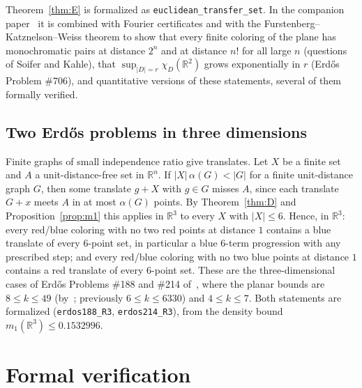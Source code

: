\documentclass[11pt]{amsart}
\theoremstyle{definition}
\newcommand{\R}{\mathbb{R}}
\begin{document}
Theorem~\ref{thm:E} is formalized as \texttt{euclidean\_transfer\_set}. In the companion paper~\cite{BassMono} it is combined with Fourier certificates and with the Furstenberg--Katznelson--Weiss theorem to show that every finite coloring of the plane has monochromatic pairs at distance $2^n$ and at distance $n!$ for all large $n$ (questions of Soifer and Kahle), that $\sup_{|D|=r}\chi_D(\R^2)$ grows exponentially in $r$ (Erd\H{o}s Problem \#706), and quantitative versions of these statements, several of them formally verified.

\subsection*{Two Erd\H{o}s problems in three dimensions}
Finite graphs of small independence ratio give translates. Let $X$ be a finite set and $A$ a unit-distance-free set in $\R^n$. If $|X|\,\alpha(G)<|G|$ for a finite unit-distance graph $G$, then some translate $g+X$ with $g\in G$ misses $A$, since each translate $G+x$ meets $A$ in at most $\alpha(G)$ points. By Theorem~\ref{thm:D} and Proposition~\ref{prop:m1} this applies in $\R^3$ to every $X$ with $|X|\le6$. Hence, in $\R^3$: every red/blue coloring with no two red points at distance $1$ contains a blue translate of every $6$-point set, in particular a blue $6$-term progression with any prescribed step; and every red/blue coloring with no two blue points at distance $1$ contains a red translate of every $6$-point set. These are the three-dimensional cases of Erd\H{o}s Problems \#188 and \#214 of~\cite{EP}, where the planar bounds are $8\le k\le49$ (by~\cite{BassRamsey}; previously $6\le k\le6330$) and $4\le k\le7$. Both statements are formalized (\texttt{erdos188\_R3}, \texttt{erdos214\_R3}), from the density bound $m_1(\R^3)\le0.1532996$.

\section{Formal verification}\label{sec:lean}
\end{document}
